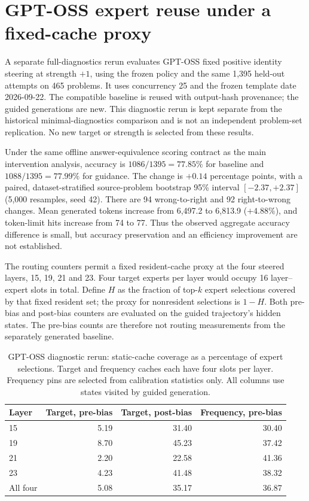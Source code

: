 \section{GPT-OSS expert reuse under a fixed-cache proxy}
\label{sec:oss-cache-diagnostics}

A separate full-diagnostics rerun evaluates GPT-OSS fixed positive identity
steering at strength $+1$, using the frozen policy and the same 1,395 held-out
attempts on 465 problems. It uses concurrency 25 and the frozen template date
2026-09-22. The compatible baseline is reused with output-hash provenance;
the guided generations are new. This diagnostic rerun is kept separate from
the historical minimal-diagnostics comparison and is not an independent
problem-set replication. No new target or strength is selected from these results.

Under the same offline answer-equivalence scoring contract as the main
intervention analysis, accuracy is $1086/1395=77.85\%$ for baseline and
$1088/1395=77.99\%$ for guidance. The change is $+0.14$ percentage points,
with a paired, dataset-stratified source-problem bootstrap 95\% interval
$[-2.37,+2.37]$ (5,000 resamples, seed 42). There are 94 wrong-to-right and
92 right-to-wrong changes. Mean generated tokens increase from 6,497.2 to
6,813.9 ($+4.88\%$), and token-limit hits increase from 74 to 77.
Thus the observed aggregate accuracy difference is small, but accuracy
preservation and an efficiency improvement are not established.

The routing counters permit a fixed resident-cache proxy at the four steered
layers, 15, 19, 21 and 23. Four target experts per layer would occupy 16
layer--expert slots in total. Define $H$ as the fraction of top-$k$ expert
selections covered by that fixed resident set; the proxy for nonresident
selections is $1-H$. Both pre-bias and post-bias counters are evaluated on
the guided trajectory's hidden states. The pre-bias counts are therefore
not routing measurements from the separately generated baseline.

\begin{table}[ht]
\centering\small
\caption{GPT-OSS diagnostic rerun: static-cache coverage as a percentage of
expert selections. Target and frequency caches each have four slots per layer.
Frequency pins are selected from calibration statistics only. All columns
use states visited by guided generation.}
\label{tab:oss-cache-coverage}
\begin{tabular}{lrrr}
\toprule
Layer & Target, pre-bias & Target, post-bias & Frequency, pre-bias \\
\midrule
15 & 5.19 & 31.40 & 30.40 \\
19 & 8.70 & 45.23 & 37.42 \\
21 & 2.20 & 22.58 & 41.36 \\
23 & 4.23 & 41.48 & 38.32 \\
All four & 5.08 & 35.17 & 36.87 \\
\bottomrule
\end{tabular}
\end{table}

